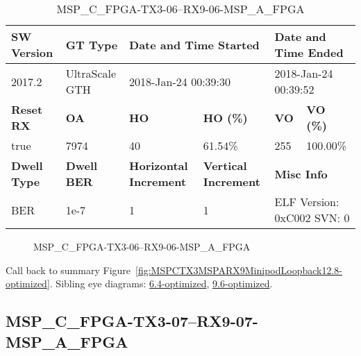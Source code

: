 \begin{table}[h]
\centering
\caption{MSP\_C\_FPGA-TX3-06--RX9-06-MSP\_A\_FPGA}
\label{tab:MSPCFPGATX306RX906MSPAFPGA12.8-optimized}
\begin{tabular}{@{}|l|l|l|l|l|l|@{}}
\toprule
\textbf{SW Version}                & \textbf{GT Type}   & \multicolumn{2}{l|}{\textbf{Date and Time Started}}            & \multicolumn{2}{l|}{\textbf{Date and Time Ended}}        \\ \midrule
2017.2                       & UltraScale GTH          & \multicolumn{2}{l|}{2018-Jan-24 00:39:30}                   & \multicolumn{2}{l|}{2018-Jan-24 00:39:52}               \\ \midrule
\textbf{Reset RX}                  & \textbf{OA} & \textbf{HO}   & \textbf{HO (\%)} & \textbf{VO} & \textbf{VO (\%)} \\ \midrule
true & 7974        & 40          & 61.54\%        & 255        & 100.00\%       \\ \midrule
\textbf{Dwell Type}                & \textbf{Dwell BER} & \textbf{Horizontal Increment} & \textbf{Vertical Increment}    & \multicolumn{2}{l|}{\textbf{Misc Info}}                  \\ \midrule
BER                            & 1e-7        & 1        & 1           & \multicolumn{2}{l|}{ELF Version: 0xC002 SVN: 0}                         \\ \bottomrule
\end{tabular}
\end{table}

\begin{figure}[h]
\caption{MSP\_C\_FPGA-TX3-06--RX9-06-MSP\_A\_FPGA} \label{fig:MSPCFPGATX306RX906MSPAFPGA12.8-optimized}
\end{figure}

Call back to summary Figure~\ref{fig:MSPCTX3MSPARX9MinipodLoopback12.8-optimized}.
Sibling eye diagrams: \hyperref[sec:MSPCFPGATX306RX906MSPAFPGA6.4-optimized]{6.4-optimized}, \hyperref[sec:MSPCFPGATX306RX906MSPAFPGA9.6-optimized]{9.6-optimized}.

\clearpage
\newpage


\subsection{MSP\_C\_FPGA-TX3-07--RX9-07-MSP\_A\_FPGA}\label{sec:MSPCFPGATX307RX907MSPAFPGA12.8-optimized}

